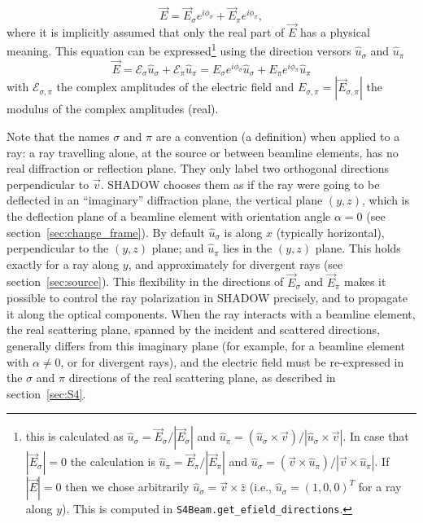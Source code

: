 \documentclass{iucr}
\begin{document}
\begin{equation}\label{eq:electricfieldray}
   \vec{E}= \vec{E}_\sigma e^{i \phi_\sigma} + \vec{E}_\pi e^{i \phi_\pi},
\end{equation}
where it is implicitly assumed that only the real part of $\vec{E}$ has a physical meaning. This equation can be expressed\footnote{
this is calculated as  
$\hat{u}_\sigma = \vec{E}_\sigma/|\vec{E}_\sigma|$ and $\hat{u}_\pi = (\hat{u}_\sigma \times \vec{v})/|\hat{u}_\sigma \times \vec{v}|$.
In case that $|\vec{E}_\sigma|=0$ the calculation is $\hat{u}_\pi = \vec{E}_\pi/|\vec{E}_\pi|$ and $\hat{u}_\sigma = (\vec{v} \times \hat{u}_\pi)/|\vec{v} \times \hat{u}_\pi|$. If $|\vec{E}|=0$ then we chose arbitrarily $\hat{u}_\sigma=\vec{v}\times\hat{z}$ (i.e., $\hat{u}_\sigma=(1,0,0)^T$ for a ray along $y$). This is computed in {\tt S4Beam.get\_efield\_directions}.
} using the direction versors $\hat{u}_\sigma$ and $\hat{u}_\pi$
\begin{equation}\label{eq:electricfieldray2}
   \vec{E}=
    \mathcal{E}_\sigma \hat{u}_\sigma + 
    \mathcal{E}_\pi \hat{u}_\pi
   =
   E_\sigma e^{i \phi_\sigma} \hat{u}_\sigma + E_\pi e^{i \phi_\pi} \hat{u}_\pi
\end{equation}
with $\mathcal{E}_{\sigma,\pi}$ the complex amplitudes of the electric field and $E_{\sigma,\pi}=|\vec{E}_{\sigma,\pi}|$ the modulus of the complex amplitudes (real).

Note that the names $\sigma$ and $\pi$ are a convention (a definition) when applied to a ray: a ray travelling alone, at the source or between beamline elements, has no real diffraction or reflection plane. They only label two orthogonal directions perpendicular to $\vec{v}$. SHADOW chooses them as if the ray were going to be deflected in an ``imaginary'' diffraction plane, the vertical plane $(y,z)$, which is the deflection plane of a beamline element with orientation angle $\alpha=0$ (see section~\ref{sec:change_frame}). By default $\hat{u}_\sigma$ is along $x$ (typically horizontal), perpendicular to the $(y,z)$ plane; and $\hat{u}_\pi$ lies in the $(y,z)$ plane. This holds exactly for a ray along $y$, and approximately for divergent rays (see section~\ref{sec:source}). This flexibility in the directions of $\vec{E}_\sigma$ and $\vec{E}_\pi$ makes it possible to control the ray polarization in SHADOW precisely, and to propagate it along the optical components.
When the ray interacts with a beamline element, the real scattering plane, spanned by the incident and scattered directions, generally differs from this imaginary plane (for example, for a beamline element with $\alpha\neq 0$, or for divergent rays), and the electric field must be re-expressed in the $\sigma$ and $\pi$ directions of the real scattering plane, as described in section~\ref{sec:S4}.
\end{document}
